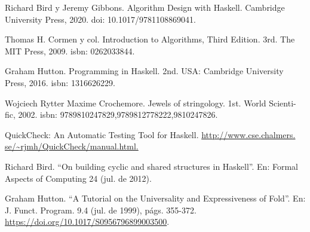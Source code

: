 \documentclass[letterpaper,11pt]{article}
\begin{document}
\begin{enumerate}[label={[\arabic*]}]
\item Richard Bird y Jeremy Gibbons. Algorithm Design with Haskell. Cambridge University Press,
2020. doi: 10.1017/9781108869041.
\item Thomas H. Cormen y col. Introduction to Algorithms, Third Edition. 3rd. The MIT Press,
2009. isbn: 0262033844.
\item Graham Hutton. Programming in Haskell. 2nd. USA: Cambridge University Press, 2016.
isbn: 1316626229.
\item Wojciech Rytter Maxime Crochemore. Jewels of stringology. 1st. World Scienti- fic, 2002.
isbn: 9789810247829,9789812778222,9810247826.
\item QuickCheck: An Automatic Testing Tool for Haskell.
\url{http://www.cse.chalmers. se/~rjmh/QuickCheck/manual.html.}
\item Richard Bird. ``On building cyclic and shared structures in Haskell''. En: Formal Aspects of
Computing 24 (jul. de 2012).
\item Graham Hutton. ``A Tutorial on the Universality and Expressiveness of Fold''.
En: J. Funct. Program. 9.4 (jul. de 1999), págs. 355-372.
\url{https://doi.org/10.1017/S0956796899003500}.

\end{enumerate}
\end{document}
